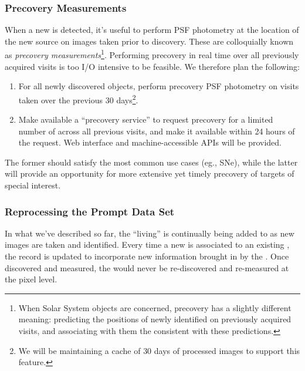 \documentclass[SE,lsstdraft,toc]{lsstdoc}
\begin{document}
\subsubsection{Precovery Measurements}

When a new \DIASource is detected, it's useful to perform  PSF photometry at the location of the new source on images taken prior to discovery. These are colloquially known as \emph{precovery measurements}\footnote{When Solar System objects are concerned, precovery has a slightly different meaning: predicting the positions of newly identified \SSObjects on previously acquired visits, and associating with them the \DIASources consistent with these predictions.}. Performing precovery in real time over all previously acquired visits is too I/O intensive to be feasible. We therefore plan the following:
\begin{enumerate}
\item For all newly discovered objects, perform precovery PSF photometry on visits taken over the previous 30 days\footnote{We will be maintaining a cache of $30$ days of processed images to support this feature.}.  
\item Make available a ``precovery service'' to request precovery for a limited number of \DIASources across all previous visits, and make it available within 24 hours of the request. Web interface and machine-accessible APIs will be provided.
\end{enumerate}

The former should satisfy the most common use cases (eg., SNe), while the latter will provide an opportunity for more extensive yet timely precovery of targets of special interest.

\subsubsection{Reprocessing the Prompt Data Set}
\label{sec:l1dbreproc}

In what we've described so far, the ``living'' \PPDB is continually being added to as new images are taken and \DIASources identified. Every time a new \DIASource is associated to an existing \DIAObject, the \DIAObject record is updated to incorporate new information brought in by the \DIASource. Once discovered and measured, the \DIASources would never be re-discovered and re-measured at the pixel level.
\end{document}
